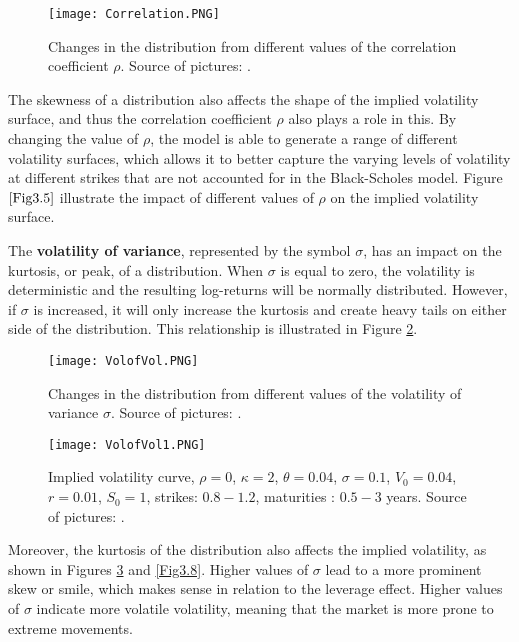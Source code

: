 \documentclass[12pt,a4paper]{report}
\theoremstyle{definition}
\begin{document}
\begin{figure}[!htbp]
	\centering
	\texttt{[image: Correlation.PNG]}
	\caption{Changes in the distribution from different values of the correlation coefficient $\rho$. Source of pictures: \parencite{moodley2005heston}.}
	\label{Fig3.3}
\end{figure}



The skewness of a distribution also affects the shape of the implied volatility surface, and thus the correlation coefficient $\rho$ also plays a role in this. By changing the value of $\rho$, the model is able to generate a range of different volatility surfaces, which allows it to better capture the varying levels of volatility at different strikes that are not accounted for in the Black-Scholes model. Figure $\ref{Fig3.5}$ illustrate the impact of different values of $\rho$ on the implied volatility surface.

The \textbf{volatility of variance}, represented by the symbol $\sigma$, has an impact on the kurtosis, or peak, of a distribution. When $\sigma$ is equal to zero, the volatility is deterministic and the resulting log-returns will be normally distributed. However, if $\sigma$ is increased, it will only increase the kurtosis and create heavy tails on either side of the distribution. This relationship is illustrated in Figure \ref{Fig3.7}.

\begin{figure}[!htbp]
	\centering
		\texttt{[image: VolofVol.PNG]}
	\caption{Changes in the distribution from different values of the volatility of variance $\sigma$. Source of pictures: \parencite{moodley2005heston}.}
	\label{Fig3.7}
\end{figure}

\begin{figure}[!htbp]
	\centering
	\texttt{[image: VolofVol1.PNG]}
	\caption{Implied volatility curve, $\rho = 0$, $\kappa = 2$,
		$\theta = 0.04$, $\sigma = 0.1$, $V_0 = 0.04$, $r = 0.01$, $S_0 =1$, strikes: $0.8 - 1.2$, maturities : $0.5 - 3$ years. Source of pictures: \parencite{moodley2005heston}.}
	\label{Fig3.9}
\end{figure}

Moreover, the kurtosis of the distribution also affects the implied volatility, as shown in Figures \ref{Fig3.9} and \ref{Fig3.8}. Higher values of $\sigma$ lead to a more prominent skew or smile, which makes sense in relation to the leverage effect. Higher values of $\sigma$ indicate more volatile volatility, meaning that the market is more prone to extreme movements.
\end{document}
